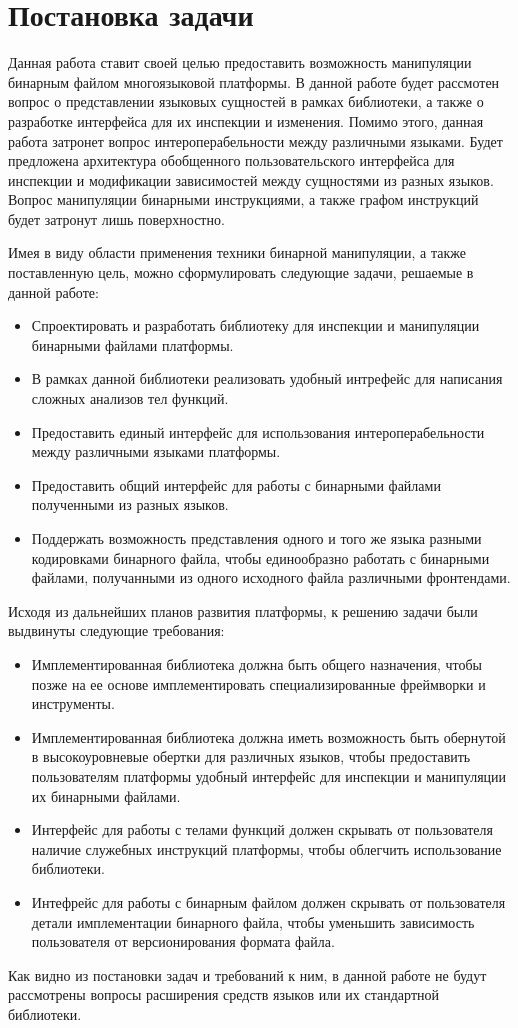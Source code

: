 \section{Постановка задачи}
\label{sec:Chapter1} 

Данная работа ставит своей целью предоставить возможность манипуляции бинарным файлом многоязыковой платформы. В данной работе будет рассмотен вопрос о представлении языковых сущностей в рамках библиотеки, а также о разработке интерфейса для их инспекции и изменения. Помимо этого, данная работа затронет вопрос интероперабельности между различными языками. Будет предложена архитектура обобщенного пользовательского интерфейса для инспекции и модификации зависимостей между сущностями из разных языков. Вопрос манипуляции бинарными инструкциями, а также графом инструкций будет затронут лишь поверхностно.

Имея в виду области применения техники бинарной манипуляции, а также поставленную цель, можно сформулировать следующие задачи, решаемые в данной работе:

\begin{itemize}
    \item Спроектировать и разработать библиотеку для инспекции и манипуляции бинарными файлами платформы.
    \item В рамках данной библиотеки реализовать удобный интрефейс для написания сложных анализов тел функций.
    \item Предоставить единый интерфейс для использования интероперабельности между различными языками платформы.
    \item Предоставить общий интерфейс для работы с бинарными файлами полученными из разных языков.
    \item Поддержать возможность представления одного и того же языка разными кодировками бинарного файла, чтобы единообразно работать с бинарными файлами, получанными из одного исходного файла различными фронтендами.
\end{itemize}

Исходя из дальнейших планов развития платформы, к решению задачи были выдвинуты следующие требования:

\begin{itemize}
    \item Имплементированная библиотека должна быть общего назначения, чтобы позже на ее основе имплементировать специализированные фреймворки и инструменты.
    \item Имплементированная библиотека должна иметь возможность быть обернутой в высокоуровневые обертки для различных языков, чтобы предоставить пользователям платформы удобный интерфейс для инспекции и манипуляции их бинарными файлами.
    \item Интерфейс для работы с телами функций должен скрывать от пользователя наличие служебных инструкций платформы, чтобы облегчить использование библиотеки.
    \item Интефрейс для работы с бинарным файлом должен скрывать от пользователя детали имплементации бинарного файла, чтобы уменьшить зависимость пользователя от версионирования формата файла.
\end{itemize}

Как видно из постановки задач и требований к ним, в данной работе не будут рассмотрены вопросы расширения средств языков или их стандартной библиотеки.

\newpage
